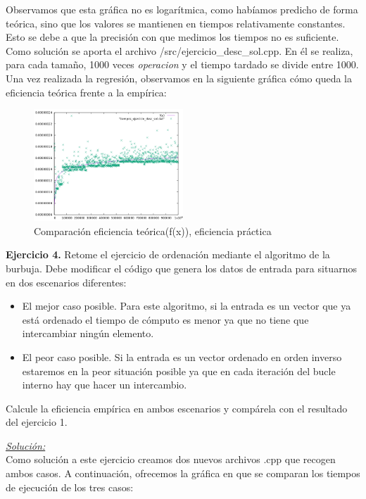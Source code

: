 \documentclass[titlepage, 12pt,a4paper]{article}
\begin{document}
	Observamos que esta gráfica no es logarítmica, como habíamos predicho de forma teórica, sino que los valores se mantienen en tiempos relativamente constantes. Esto se debe a que la precisión con que medimos los tiempos no es suficiente. Como solución se aporta el archivo /src/ejercicio\_desc\_sol.cpp. En él se realiza, para cada tamaño, 1000 veces \textit{operacion} y el tiempo tardado se divide entre 1000.
	Una vez realizada la regresión, observamos en la siguiente gráfica cómo queda la eficiencia teórica frente a la empírica:
	\begin{figure}[!ht]
  \caption{Comparación eficiencia teórica(f(x)), eficiencia práctica}
  \centering
    \includegraphics[width=0.5\textwidth]{./img/ef_pract_ej_3_2.png}
\end{figure}
\newpage
	\newpage
  
	\textbf{\large Ejercicio 4.} Retome el ejercicio de ordenación mediante el algoritmo de la burbuja. Debe modificar el código que genera los datos de entrada para situarnos en dos escenarios diferentes:
	\begin{itemize}
	\item	El mejor caso posible. Para este algoritmo, si la entrada es un vector que ya está ordenado el tiempo de cómputo es menor ya que no tiene que intercambiar ningún elemento.
	\item	El peor caso posible. Si la entrada es un vector ordenado en orden inverso estaremos en la peor situación posible ya que en cada iteración del bucle interno hay que hacer un intercambio. 
	\end{itemize}
	Calcule la eficiencia empírica en ambos escenarios y compárela con el resultado del ejercicio 1.
\vspace {1em}	

\underline{\emph{Solución:}}\\
Como solución a este ejercicio creamos dos nuevos archivos .cpp que recogen ambos casos. A continuación, ofrecemos la gráfica en que se comparan los tiempos de ejecución de los tres casos:
\end{document}

